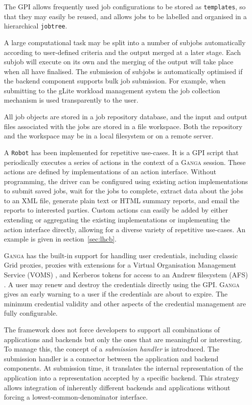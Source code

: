 \documentclass{elsart}
\def\ganga {\textsc{Ganga}\xspace}
\def\grid {Grid\xspace}
\def\GPI{GPI\xspace}
\newcommand{\code}[1]{\texttt{#1}}
\begin{document}
The \GPI allows frequently used job configurations to be
stored as \code{templates}, so that they may easily be reused, and allows
jobs to be labelled and organised in a hierarchical \code{jobtree}.

A large computational task may be split into a number of subjobs
automatically according to user-defined criteria and the output merged
at a later stage. Each subjob will execute on its own and the merging
of the output will take place when all have finalised. The
submission of subjobs is automatically optimised if the backend
component supports bulk job submission. For example, when submitting to
the gLite workload management system \cite{andreetto_2008} the job collection
mechanism is used transparently to the user.

All job objects are stored in a job repository database, and the input
and output files associated with the jobs are stored in a file workspace. Both
the repository and the workspace may be in a local filesystem or on a remote
server.

A \code{Robot} has been implemented for repetitive use-cases. It is a \GPI
script that periodically executes a series of
actions in the context of a \ganga session.  These actions are defined by
implementations of an action interface.  Without programming, the driver can be
configured using existing action implementations to submit saved jobs, wait
for the jobs to complete, extract data about the jobs to an XML file, generate
plain text or HTML summary reports, and email the reports to interested
parties. Custom actions can easily be added by either extending or aggregating
the existing implementations or implementing the action interface directly,
allowing for a diverse variety of repetitive use-cases. An example is given
in section~\ref{sec:lhcb}.


\ganga has the built-in support for handling user credentials, including
classic \grid proxies, proxies with extensions for a Virtual Organisation Management
Service (VOMS) \cite{VOMS}, and Kerberos \cite{kerberos} tokens
for access to an Andrew filesystem (AFS) \cite{AFS}. A user may renew and destroy the
credentials directly using the GPI. \ganga gives an early warning to a
user if the credentials are about to expire. The minimum credential
validity and other aspects of the credential management are fully
configurable.

The framework does not force developers to support all combinations of
applications and backends but only the ones that are meaningful or interesting. To manage
this, the concept of a {\em submission handler} is introduced. The submission
handler is a connector between the application and backend components. At
submission time, it translates the internal representation of the application
into a representation accepted by a specific backend. This strategy allows
integration of inherently different backends and applications without forcing
a lowest-common-denominator interface.
\end{document}
